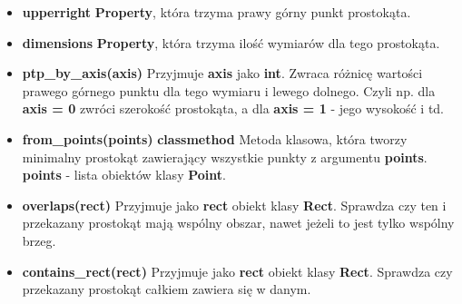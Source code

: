 \documentclass[a4paper, 12pt]{article}
\begin{document}
\begin{itemize}
          \item \textbf{upperright} \vspace{6pt}\newline
          \quad \textbf{Property}, która trzyma prawy górny punkt prostokąta.
          \vspace{6pt}
          
          \item \textbf{dimensions} \vspace{6pt}\newline
          \quad \textbf{Property}, która trzyma ilość wymiarów dla tego prostokąta.
          \vspace{6pt}
          
          \item \textbf{ptp\_by\_axis(axis)} \vspace{6pt}\newline
          \quad Przyjmuje \textbf{axis} jako \textbf{int}. Zwraca różnicę wartości prawego górnego punktu dla tego wymiaru i lewego dolnego. Czyli np. dla \textbf{axis = 0} zwróci szerokość prostokąta, a dla \textbf{axis = 1} - jego wysokość i td.
          \vspace{6pt}
          
          \item \textbf{from\_points(points)} \vspace{6pt}\newline
          \quad \textbf{classmethod} Metoda klasowa, która tworzy minimalny prostokąt zawierający wszystkie punkty z argumentu \textbf{points}. \textbf{points} - lista obiektów klasy \textbf{Point}.
          \vspace{6pt}
          
          \item \textbf{overlaps(rect)} \vspace{6pt}\newline
          \quad Przyjmuje jako \textbf{rect} obiekt klasy \textbf{Rect}. Sprawdza czy ten i przekazany prostokąt mają wspólny obszar, nawet jeżeli to jest tylko wspólny brzeg.
          \vspace{6pt}
          
          \item \textbf{contains\_rect(rect)} \vspace{6pt}\newline
          \quad Przyjmuje jako \textbf{rect} obiekt klasy \textbf{Rect}. Sprawdza czy przekazany prostokąt całkiem zawiera się w danym.
          \vspace{6pt}
          

\end{itemize}
\end{document}
